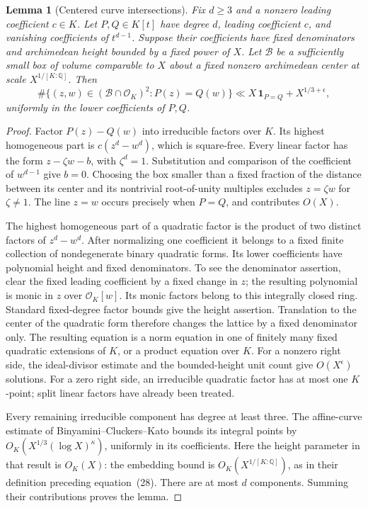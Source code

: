 \documentclass[11pt]{amsart}
\newtheorem{lemma}[theorem]{Lemma}
\theoremstyle{definition}
\numberwithin{equation}{section}
\begin{document}
\begin{lemma}[Centered curve intersections]
\label{lem:centered-curve-intersections}
Fix $d\ge3$ and a nonzero leading coefficient $c\in K$.
Let $P,Q\in K[t]$ have degree $d$, leading coefficient $c$, and
vanishing coefficients of $t^{d-1}$. Suppose their coefficients
have fixed denominators and archimedean height bounded by a fixed
power of $X$. Let $\mathcal B$ be a sufficiently small box of
volume comparable to $X$ about a fixed nonzero archimedean center
at scale $X^{1/[K:\mathbb Q]}$. Then
\[
 \#\{(z,w)\in(\mathcal B\cap\mathcal O_K)^2:P(z)=Q(w)\}
 \ll X\,\mathbf1_{P=Q}+X^{1/3+\epsilon},
\]
uniformly in the lower coefficients of $P,Q$.
\end{lemma}
\begin{proof}
Factor $P(z)-Q(w)$ into irreducible factors over $K$.
Its highest homogeneous part is $c(z^d-w^d)$, which is square-free.
Every linear factor has the form $z-\zeta w-b$, with $\zeta^d=1$.
Substitution and comparison of the coefficient of $w^{d-1}$ give
$b=0$. Choosing the box smaller than a fixed fraction of the
distance between its center and its nontrivial root-of-unity
multiples excludes $z=\zeta w$ for $\zeta\ne1$.
The line $z=w$ occurs precisely when $P=Q$, and contributes $O(X)$.

The highest homogeneous part of a quadratic factor is the product
of two distinct factors of $z^d-w^d$. After normalizing one
coefficient it belongs to a fixed finite collection of nondegenerate
binary quadratic forms. Its lower coefficients have polynomial
height and fixed denominators. To see the denominator assertion,
clear the fixed leading coefficient by a fixed change in $z$;
the resulting polynomial is monic in $z$ over $\mathcal O_K[w]$.
Its monic factors belong to this integrally closed ring.
Standard fixed-degree factor bounds give the height assertion.
Translation to the center of the quadratic form therefore changes
the lattice by a fixed denominator only. The resulting equation is
a norm equation in one of finitely many fixed quadratic extensions
of $K$, or a product equation over $K$.
For a nonzero right side, the ideal-divisor estimate and the
bounded-height unit count give $O(X^\epsilon)$ solutions.
For a zero right side, an irreducible quadratic factor has at most
one $K$-point; split linear factors have already been treated.

Every remaining irreducible component has degree at least three.
The affine-curve estimate of Binyamini--Cluckers--Kato
\cite[Corollary~12]{BCK2025} bounds its integral points by
$O_K(X^{1/3}(\log X)^\kappa)$, uniformly in its coefficients.
Here the height parameter in that result is $O_K(X)$: the
embedding bound is $O_K(X^{1/[K:\mathbb Q]})$, as in their
definition preceding equation~(28).
There are at most $d$ components. Summing their contributions
proves the lemma.
\end{proof}
\end{document}
